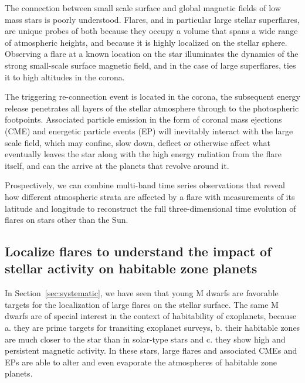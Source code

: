 \documentclass[proof]{WileyASNA-v1}
\begin{document}

The connection between small scale surface and global magnetic fields of low mass stars is poorly understood. Flares, and in particular large stellar superflares, are unique probes of both because they occupy a volume that spans a wide range of atmospheric heights, and because it is highly localized on the stellar sphere. Observing a flare at a known location on the star illuminates the dynamics of the strong small-scale surface magnetic field, and in the case of large superflares, ties it to high altitudes in the corona.

The triggering re-connection event is located in the corona, the subsequent energy release penetrates all layers of the stellar atmosphere through to the photospheric footpoints. Associated particle emission in the form of coronal mass ejections (CME) and energetic particle events (EP) will inevitably interact with the large scale field, which may confine, slow down, deflect or otherwise affect what eventually leaves the star along with the high energy radiation from the flare itself, and can the arrive at the planets that revolve around it. 

Prospectively, we can combine multi-band time series observations that reveal how different atmospheric strata are affected by a flare with measurements of its latitude and longitude to reconstruct the full three-dimensional time evolution of flares on stars other than the Sun. %
\subsection{Localize flares to understand the impact of stellar activity on habitable zone planets}\label{sec:planets}



In Section~\ref{sec:systematic}, we have seen that young M dwarfs are favorable targets for the localization of large flares on the stellar surface. 
The same M dwarfs are of special interest in the context of habitability of exoplanets, because a. they are prime targets for transiting exoplanet surveys, b. their habitable zones are much closer to the star than in solar-type stars and c. they show high and persistent magnetic activity.
In these stars, large flares and associated CMEs and EPs are able to alter and even evaporate the atmospheres of habitable zone planets.
\end{document}
